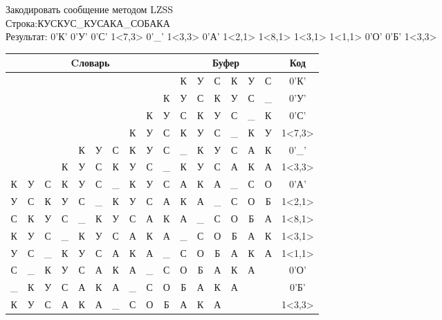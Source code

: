 \documentclass[a4paper, 12pt]{article}
\begin{document}
Закодировать сообщение методом LZSS\\
Строка:КУСКУС\_КУСАКА\_СОБАКА\\
Результат: 0'К' 0'У' 0'С' 1<7,3> 0'\_' 1<3,3> 0'А' 1<2,1> 1<8,1> 1<3,1> 1<1,1> 0'О' 0'Б' 1<3,3>\\
\begin{table}[h!]
\centering
\begin{tabular}{|c|c|c|c|c|c|c|c|c|c|c|c|c|c|c|c|c|}
\hline
\multicolumn{10}{|c|}{Cловарь} & \multicolumn{6}{c|}{Буфер} & Код  \\ \hline
  &   &   &   &   &   &   &   &   &   & К & У & С & К & У & С & 0'К'\\ \hline
  &   &   &   &   &   &   &   &   & К & У & С & К & У & С & \_ & 0'У'\\ \hline
  &   &   &   &   &   &   &   & К & У & С & К & У & С & \_ & К & 0'С'\\ \hline
  &   &   &   &   &   &   & \cellcolor[HTML]{FFFF00} К & \cellcolor[HTML]{FFFF00} У & \cellcolor[HTML]{FFFF00} С & \cellcolor[HTML]{FFFF00} К & \cellcolor[HTML]{FFFF00} У & \cellcolor[HTML]{FFFF00} С & \_ & К & У & 1<7,3>\\ \hline
  &   &   &   & К & У & С & К & У & С & \_ & К & У & С & А & К & 0'\_'\\ \hline
  &   &   & \cellcolor[HTML]{FFFF00} К & \cellcolor[HTML]{FFFF00} У & \cellcolor[HTML]{FFFF00} С & К & У & С & \_ & \cellcolor[HTML]{FFFF00} К & \cellcolor[HTML]{FFFF00} У & \cellcolor[HTML]{FFFF00} С & А & К & А & 1<3,3>\\ \hline
К & У & С & К & У & С & \_ & К & У & С & А & К & А & \_ & С & О & 0'А'\\ \hline
У & С & \cellcolor[HTML]{FFFF00} К & У & С & \_ & К & У & С & А & \cellcolor[HTML]{FFFF00} К & А & \_ & С & О & Б & 1<2,1>\\ \hline
С & К & У & С & \_ & К & У & С & \cellcolor[HTML]{FFFF00} А & К & \cellcolor[HTML]{FFFF00} А & \_ & С & О & Б & А & 1<8,1>\\ \hline
К & У & С & \cellcolor[HTML]{FFFF00} \_ & К & У & С & А & К & А & \cellcolor[HTML]{FFFF00} \_ & С & О & Б & А & К & 1<3,1>\\ \hline
У & \cellcolor[HTML]{FFFF00} С & \_ & К & У & С & А & К & А & \_ & \cellcolor[HTML]{FFFF00} С & О & Б & А & К & А & 1<1,1>\\ \hline
С & \_ & К & У & С & А & К & А & \_ & С & О & Б & А & К & А &   & 0'О'\\ \hline
\_ & К & У & С & А & К & А & \_ & С & О & Б & А & К & А &   &   & 0'Б'\\ \hline
К & У & С & \cellcolor[HTML]{FFFF00} А & \cellcolor[HTML]{FFFF00} К & \cellcolor[HTML]{FFFF00} А & \_ & С & О & Б & \cellcolor[HTML]{FFFF00} А & \cellcolor[HTML]{FFFF00} К & \cellcolor[HTML]{FFFF00} А &   &   &   & 1<3,3>\\ \hline
\end{tabular}
\end{table}
\end{document}
